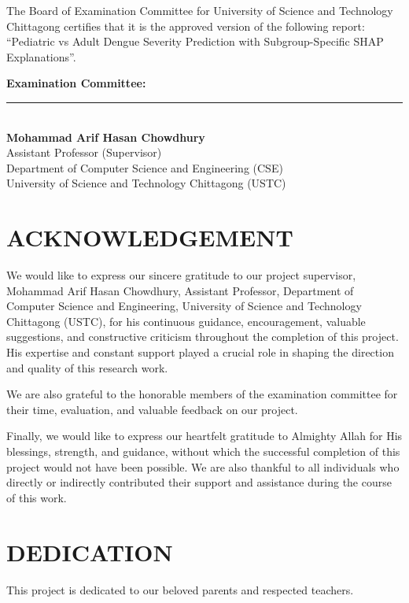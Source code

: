 \documentclass[12pt, a4paper]{report}
\begin{document}
The Board of Examination Committee for University of Science and Technology Chittagong certifies that it is the approved version of the following report: ``Pediatric vs Adult Dengue Severity Prediction with Subgroup-Specific SHAP Explanations''.

\vspace{1.5cm}
\noindent
\textbf{Examination Committee:}\\

\vspace{1cm}
\noindent\rule{6cm}{0.4pt}\\
\textbf{Mohammad Arif Hasan Chowdhury}\\
Assistant Professor (Supervisor)\\
Department of Computer Science and Engineering (CSE)\\
University of Science and Technology Chittagong (USTC)

\chapter*{ACKNOWLEDGEMENT}
We would like to express our sincere gratitude to our project supervisor, Mohammad Arif Hasan Chowdhury, Assistant Professor, Department of Computer Science and Engineering, University of Science and Technology Chittagong (USTC), for his continuous guidance, encouragement, valuable suggestions, and constructive criticism throughout the completion of this project. His expertise and constant support played a crucial role in shaping the direction and quality of this research work.

We are also grateful to the honorable members of the examination committee for their time, evaluation, and valuable feedback on our project.

Finally, we would like to express our heartfelt gratitude to Almighty Allah for His blessings, strength, and guidance, without which the successful completion of this project would not have been possible. We are also thankful to all individuals who directly or indirectly contributed their support and assistance during the course of this work.

\chapter*{DEDICATION}
This project is dedicated to our beloved parents and respected teachers.
\end{document}
